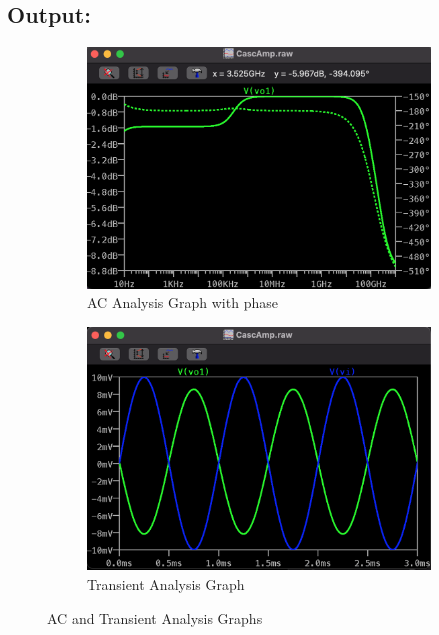 \documentclass[a4paper,12pt]{report}
\begin{document}
  \subsection{Output:} 
    \hspace{20pt}\begin{figure}[h!]
        \begin{subfigure}[b]{0.48\textwidth} %
        \includegraphics[width=\textwidth]{../Img/E2ACOp.png}
        \caption{AC Analysis Graph with phase}
    \end{subfigure}
    \hfill
    \begin{subfigure}[b]{0.48\textwidth} %
        \includegraphics[width=\textwidth]{../Img/E2Tran.png}
        \caption{Transient Analysis Graph}
    \end{subfigure}
    \caption{AC and Transient Analysis Graphs}

    \end{figure}
\end{document}
